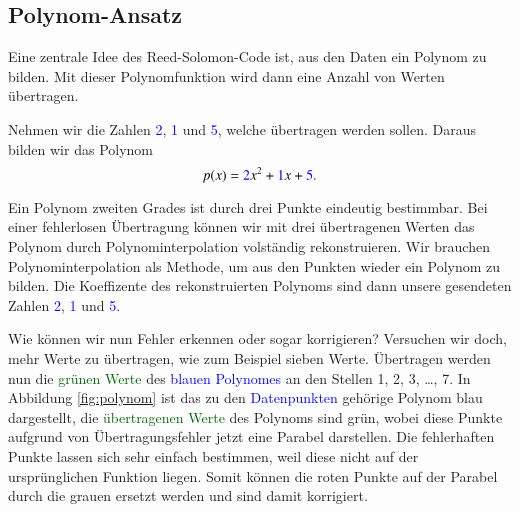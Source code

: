\subsection{Polynom-Ansatz
\label{reedsolomon:section:polynomansatz}}
Eine zentrale Idee des Reed-Solomon-Code ist, aus den Daten ein Polynom zu bilden. 
Mit dieser Polynomfunktion wird dann eine Anzahl von Werten übertragen.
\begin{beispiel} Nehmen wir die Zahlen \textcolor{blue}{2}, \textcolor{blue}{1} und \textcolor{blue}{5}, welche übertragen werden sollen. Daraus bilden wir das Polynom
\begin{equation}
p(x)
=
\textcolor{blue}{2}x^2 + \textcolor{blue}{1}x + \textcolor{blue}{5}.
\label{reedsolomon:equation1}
\end{equation}

Ein Polynom zweiten Grades ist durch drei Punkte eindeutig bestimmbar. 
Bei einer fehlerlosen Übertragung können wir mit drei übertragenen Werten
    das Polynom durch Polynominterpolation volständig rekonstruieren.
Wir brauchen Polynominterpolation als Methode, um aus den Punkten wieder ein Polynom zu bilden.
Die Koeffizente des rekonstruierten Polynoms sind dann unsere gesendeten Zahlen \textcolor{blue}{2}, \textcolor{blue}{1} und \textcolor{blue}{5}.

Wie können wir nun Fehler erkennen oder sogar korrigieren?
Versuchen wir doch, mehr Werte zu übertragen, wie zum Beispiel sieben Werte. 
Übertragen werden nun die \textcolor{darkgreen}{grünen Werte} 
    des \textcolor{blue}{blauen Polynomes} an den Stellen 1, 2, 3, \dots , 7.
In Abbildung \ref{fig:polynom} ist das zu den \textcolor{blue}{Datenpunkten} gehörige Polynom blau dargestellt,
die \textcolor{darkgreen}{übertragenen Werte} des Polynoms sind grün, wobei diese Punkte aufgrund von Übertragungsfehler jetzt eine Parabel darstellen. 
Die fehlerhaften Punkte lassen sich sehr einfach bestimmen, weil diese nicht auf der ursprünglichen Funktion liegen. 
Somit können die roten Punkte auf der Parabel durch die grauen ersetzt werden und sind damit korrigiert. 


\end{beispiel}

